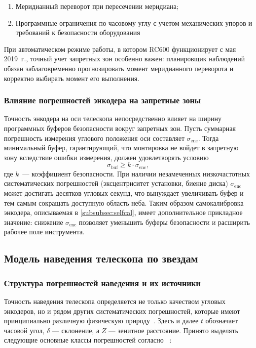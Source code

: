 \begin{enumerate}
    \item Меридианный переворот при пересечении меридиана;
    \item Программные ограничения по часовому углу с учетом механических упоров и требований к безопасности оборудования
\end{enumerate}

При автоматическом режиме работы, в котором RC600 функционирует с мая 2019~г., точный учет запретных зон особенно важен: планировщик наблюдений обязан заблаговременно прогнозировать момент меридианного переворота и корректно выбирать момент его выполнения.

\subsubsection{Влияние погрешностей энкодера на запретные зоны}
\label{subsec:encoder_forbidden}

Точность энкодера на оси телескопа непосредственно влияет на ширину программных буферов безопасности вокруг запретных зон. Пусть суммарная погрешность измерения углового положения оси составляет $\sigma_{\text{enc}}$. Тогда минимальный буфер, гарантирующий, что монтировка не войдет в запретную зону вследствие ошибки измерения, должен удовлетворять условию
\[
\sigma_{\text{buf}} \geq k \cdot \sigma_{\text{enc}},
\]
где $k$~--- коэффициент безопасности. При наличии незамеченных низкочастотных систематических погрешностей (эксцентриситет установки, биение диска) $\sigma_{\text{enc}}$ может достигать десятков угловых секунд, что вынуждает увеличивать буфер и тем самым сокращать доступную область неба. Таким образом самокалибровка энкодера, описываемая в \ref{subsubsec:selfcal}, имеет дополнительное прикладное значение: снижение $\sigma_{\text{enc}}$ позволяет уменьшить буферы безопасности и расширить рабочее поле инструмента.

\subsection{Модель наведения телескопа по звездам}
\label{subsec:pointing}

\subsubsection{Структура погрешностей наведения и их источники}
\label{subsubsec:pointing_errors}

Точность наведения телескопа определяется не только качеством угловых энкодеров, но и рядом других систематических погрешностей, которые имеют принципиально различную физическую природу~\cite{TPoint_Wallace}\cite{EngineersView}. Здесь и далее $t$ обозначает часовой угол, $\delta$ --- склонение, а $Z$ --- зенитное расстояние. Принято выделять следующие основные классы погрешностей согласно ~\cite{TPoint_Wallace}:

